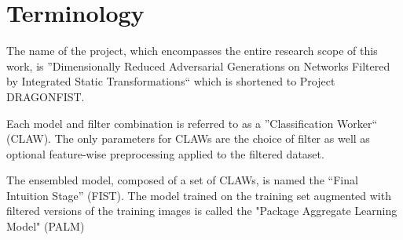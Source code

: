 \section{Terminology} \label{s:terminology}
The name of the project, which encompasses the entire research scope of this work, is ''Dimensionally Reduced Adversarial Generations on Networks Filtered by Integrated Static Transformations`` which is shortened to Project DRAGONFIST.

Each model and filter combination is referred to as a ''Classification Worker`` (CLAW). The only parameters for CLAWs are the choice of filter as well as optional feature-wise preprocessing applied to the filtered dataset.

The ensembled model, composed of a set of CLAWs, is named the ``Final Intuition Stage'' (FIST). The model trained on the training set augmented with filtered versions of the training images is called the "Package Aggregate Learning Model" (PALM)
